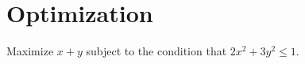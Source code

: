 \section{Optimization\label{sec:optimization}}
\begin{example}
\label{exa:isi2006samplepsb2}Maximize $x+y$ subject to the condition
that $2x^{2}+3y^{2}\leq1$.
\end{example}


